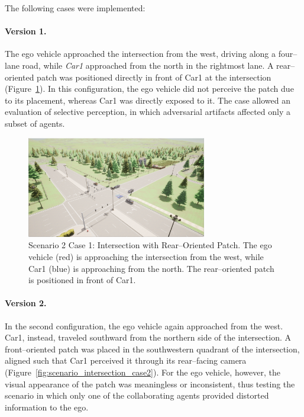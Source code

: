 The following cases were implemented:

\paragraph{Version 1.}  
The ego vehicle approached the intersection from the west, driving along a four–lane road, while \textit{Car1} approached from the north in the rightmost lane.  
A rear–oriented patch was positioned directly in front of Car1 at the intersection (Figure~\ref{fig:scenario_intersection_case1}). In this configuration, the ego vehicle did not perceive the patch due to its placement, whereas Car1 was directly exposed to it. The case allowed an evaluation of selective perception, in which adversarial artifacts affected only a subset of agents.

\begin{figure}[H]
    \centering
    \includegraphics[width=0.7\textwidth]{figures/experiments/scenario2_v1.png}
    \caption{Scenario 2 Case 1: Intersection with Rear–Oriented Patch. The ego vehicle (red) is approaching the intersection from the west, while Car1 (blue) is approaching from the north. The rear–oriented patch is positioned in front of Car1.}
    \label{fig:scenario_intersection_case1}
\end{figure}

\paragraph{Version 2.}  
In the second configuration, the ego vehicle again approached from the west. Car1, instead, traveled southward from the northern side of the intersection. A front–oriented patch was placed in the southwestern quadrant of the intersection, aligned such that Car1 perceived it through its rear–facing camera (Figure~\ref{fig:scenario_intersection_case2}).  
For the ego vehicle, however, the visual appearance of the patch was meaningless or inconsistent, thus testing the scenario in which only one of the collaborating agents provided distorted information to the ego.

